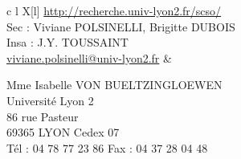 \begin{flushleft}
\begin{tabu} {c l X[l]}
{  \url{http://recherche.univ-lyon2.fr/scso/}\\%
  Sec : Viviane POLSINELLI, Brigitte DUBOIS\\%
  Insa : J.Y. TOUSSAINT\\%
  \url{viviane.polsinelli@univ-lyon2.fr}%
} & \parbox[t]{10cm}{%
  {\fontsize{11pt}{12pt}\selectfont Mme Isabelle VON BUELTZINGLOEWEN}\\%
  Université Lyon 2\\%
  86 rue Pasteur\\%
  69365 LYON Cedex 07\\%
  Tél : 04 78 77 23 86 Fax : 04 37 28 04 48%
}%
\end{tabu}
\end{flushleft}
\endgroup
\restoregeometry
\eject 